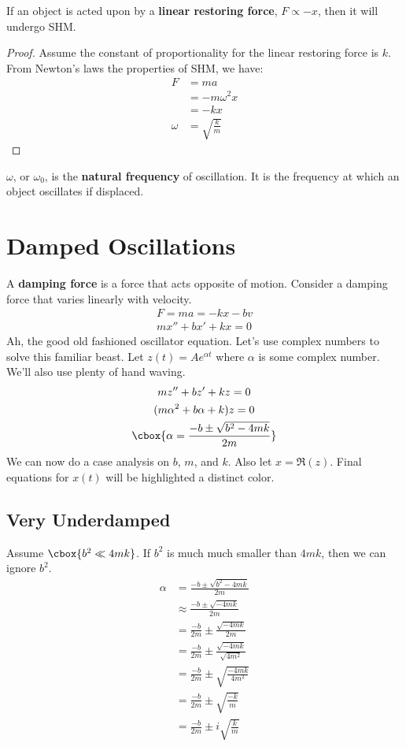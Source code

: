 \documentclass{hw}
\renewcommand\emph[1]{{\bf\color{BlueViolet}#1}}
\begin{document}
\begin{claim}
If an object is acted upon by a \emph{linear restoring force}, $F \propto -x$,
then it will undergo SHM.
\begin{proof}
Assume the constant of proportionality for the linear restoring force is $k$.
From Newton's laws the properties of SHM, we have:
\begin{align*}
  F &= ma \\
    &= -m \omega^2 x \\
    &= -k x \\
  \omega &= \sqrt{\frac{k}{m}}
\end{align*}
\end{proof}
\end{claim}

$\omega$, or $\omega_0$, is the \emph{natural frequency} of oscillation. It is
the frequency at which an object oscillates if displaced.

\section{Damped Oscillations}
A \emph{damping force} is a force that acts opposite of motion. Consider a
damping force that varies linearly with velocity. 
\begin{gather*}
  F = ma = -kx -bv \\
  mx'' + bx' + kx = 0
\end{gather*}
Ah, the good old fashioned oscillator equation. Let's use complex numbers to
solve this familiar beast. Let $z(t) = Ae^{\alpha t}$ where $\alpha$ is some
complex number. We'll also use plenty of hand waving.
\begin{gather*}
  mz'' + bz' + kz = 0 \\
  (m\alpha^2 + b\alpha + k)z = 0 \\
  \cbox{\alpha = \frac{-b \pm \sqrt{b^2 - 4mk}}{2m}}
\end{gather*}
We can now do a case analysis on $b$, $m$, and $k$. Also let $x = \Re({z})$.
Final equations for $x(t)$ will be highlighted a distinct color.

\subsection{Very Underdamped}
Assume $\cbox{b^2 \ll 4mk}$. If $b^2$ is much much smaller than $4mk$, then we
can ignore $b^2$.
\begin{align*}
  \alpha &= \frac{-b \pm \sqrt{b^2 - 4mk}}{2m} \\
         &\approx \frac{-b \pm \sqrt{-4mk}}{2m} \\
         &= \frac{-b}{2m} \pm \frac{\sqrt{-4mk}}{2m} \\
         &= \frac{-b}{2m} \pm \frac{\sqrt{-4mk}}{\sqrt{4m^2}} \\
         &= \frac{-b}{2m} \pm \sqrt{\frac{-4mk}{4m^2}} \\
         &= \frac{-b}{2m} \pm \sqrt{\frac{-k}{m}} \\
         &= \frac{-b}{2m} \pm i\sqrt{\frac{k}{m}} 
\end{align*}
\end{document}
